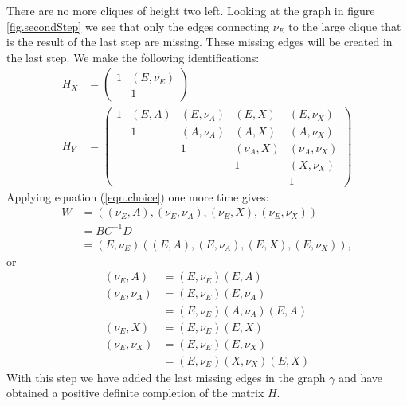 \documentclass[11pt, a4paper]{article}
\begin{document}
There are no more cliques of height two left. Looking at the graph in figure \ref{fig.secondStep} we see that only the edges connecting $\nu_E$ to the large clique that is the result of the last step are missing. These missing edges will be created in the last step. We make the following identifications:
\begin{align}
		H_X & = \begin{pmatrix}
		1 & (E, \nu_E) \\
		& 1
	\end{pmatrix} \\
	H_Y & = \begin{pmatrix}
		1 & (E,A) & (E,\nu_A) & (E,X) & (E,\nu_X) \\
		& 1 &  (A,\nu_A) & (A,X) & (A,\nu_X) \\
		& & 1 & (\nu_A,X) & (\nu_A,\nu_X) \\
		& & & 1 & (X,\nu_X) \\
		& & & & 1 
	\end{pmatrix}
\end{align}
Applying equation (\ref{eqn.choice}) one more time gives:
\begin{align}
	W &= ( (\nu_E,A),(\nu_E,\nu_A),(\nu_E,X),(\nu_E,\nu_X) ) \\ 
	& = BC^{-1}D \\
	& = (E, \nu_E) ( (E,A),(E,\nu_A),(E,X),(E,\nu_X) ), 
\end{align}
or
\begin{align}
	(\nu_E,A) & = (E, \nu_E) (E,A) \\
	(\nu_E,\nu_A) & = (E, \nu_E) (E,\nu_A) \\
	& = (E, \nu_E) (A,\nu_A) (E,A) \\
	(\nu_E,X) & = (E, \nu_E) (E,X) \\
	(\nu_E,\nu_X) & = (E, \nu_E) (E,\nu_X) \\
	& = (E, \nu_E) (X, \nu_X)(E,X)
\end{align}
With this step we have added the last missing edges in the graph $\gamma$ and have obtained a positive definite completion of the matrix $H$.
\end{document}
